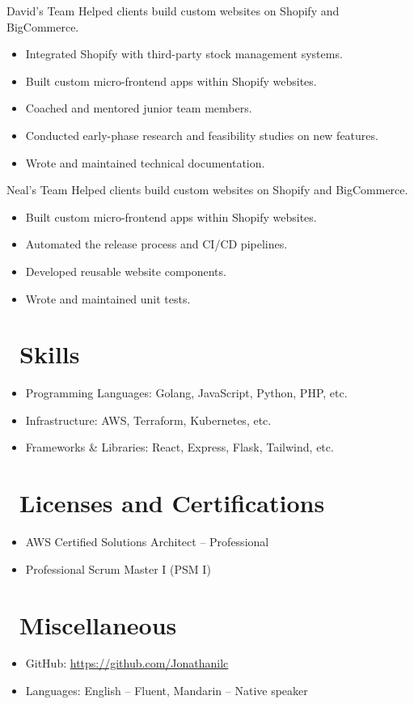 \documentclass{resume}
\begin{document}
 {David's Team}
Helped clients build custom websites on Shopify and BigCommerce.
\begin{itemize}
  \item Integrated Shopify with third-party stock management systems.
  \item Built custom micro-frontend apps within Shopify websites.
  \item Coached and mentored junior team members.
  \item Conducted early-phase research and feasibility studies on new features.
  \item Wrote and maintained technical documentation.
\end{itemize}

 {Neal's Team}
Helped clients build custom websites on Shopify and BigCommerce.
\begin{itemize}
  \item Built custom micro-frontend apps within Shopify websites.
  \item Automated the release process and CI/CD pipelines.
  \item Developed reusable website components.
  \item Wrote and maintained unit tests.
\end{itemize}

\section{\faCogs\ Skills}
\begin{itemize}[parsep=0.5ex]
  \item Programming Languages: Golang, JavaScript, Python, PHP, etc.
  \item Infrastructure: AWS, Terraform, Kubernetes, etc.
  \item Frameworks & Libraries: React, Express, Flask, Tailwind, etc.
\end{itemize}

\section{\faHeartO\ Licenses and Certifications}
\begin{itemize}[parsep=0.5ex]
  \item AWS Certified Solutions Architect – Professional
  \item Professional Scrum Master I (PSM I)
\end{itemize}


\section{\faInfo\ Miscellaneous}
\begin{itemize}[parsep=0.5ex]
  \item GitHub: \url{https://github.com/Jonathanilc}
  \item Languages: English – Fluent, Mandarin – Native speaker
\end{itemize}

%
%
\end{document}
